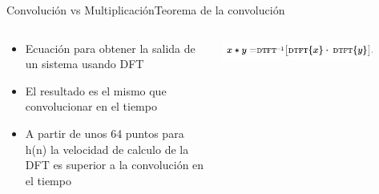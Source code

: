 \begin{frame}[t]{Convolución vs Multiplicación}{Teorema de la convolución}
   \begin{columns}[t]
      \begin{column}{.5\textwidth}
         \begin{itemize}
            \item{Ecuación para obtener la salida de un sistema usando DFT}
            \item{El resultado es el mismo que convolucionar en el tiempo}
            \item{A partir de unos 64 puntos para h(n) la velocidad de calculo de la DFT es superior a la convolución en el tiempo}
         \end{itemize}
      \end{column}
      \hspace{2pt}
      \vrule
      \hspace{2pt}
      \begin{column}{.5\textwidth}
            \center\includegraphics[width=0.8\textwidth]{5_clase/teorema_conv_eq}
      \end{column}
      \hspace{2pt}
   \end{columns}
   \vfill
\end{frame}
